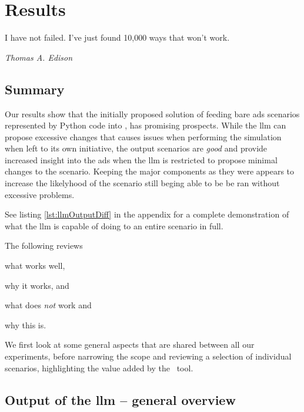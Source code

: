 \chapter{Results}\label{sec:results}

\epigraph{I have not failed. I've just found 10,000 ways that won't work.}{\textit{Thomas A.
        Edison}}

\section*{Summary}

Our results show that the initially proposed solution of feeding bare
\acrshort{ads} scenarios represented by Python code into , has promising prospects.
While the \acrshort{llm} can propose excessive changes that causes issues when performing the
simulation when left to its own initiative, the output scenarios are \emph{good} and provide
increased insight into the \acrshort{ads} when the \acrshort{llm} is restricted to propose minimal
changes to the scenario. Keeping the major components as they were appears to increase the
likelyhood of the scenario still beging able to be be ran without excessive problems.

See listing \ref{lst:llmOutputDiff} in the  appendix for a complete
demonstration of what the \acrlong{llm} is capable of doing to an entire scenario in full.

The following reviews \begin{inparaenum}
    \item what works well,
    \item why it works, and
    \item what does \emph{not} work and
    \item why this is.
\end{inparaenum} We first look at some general aspects that are shared between all our experiments, before narrowing
the scope and reviewing a selection of individual scenarios, highlighting the value added by the
\hefe~tool.


\section{Output of the \acrshort{llm} -- general overview}

